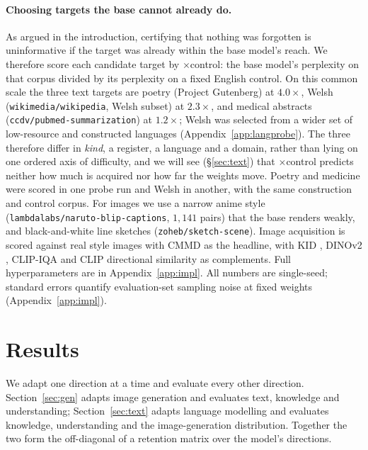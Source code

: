 \documentclass{article}
\begin{document}
\paragraph{Choosing targets the base cannot already do.}
As argued in the introduction, certifying that nothing was forgotten is
uninformative if the target was already within the base model's reach. We
therefore score each candidate target by $\times$control: the base model's
perplexity on that corpus divided by its perplexity on a fixed English control.
On this common scale the three text targets are poetry (Project Gutenberg) at
$4.0\times$, Welsh (\texttt{wikimedia/wikipedia}, Welsh subset) at $2.3\times$,
and medical abstracts (\texttt{ccdv/pubmed-summarization}) at $1.2\times$; Welsh
was selected from a wider set of low-resource and constructed languages
(Appendix~\ref{app:langprobe}). The
three therefore differ in \emph{kind}, a register, a language and a domain,
rather than lying on one ordered axis of difficulty, and we will see
(\S\ref{sec:text}) that $\times$control predicts neither how much is acquired nor
how far the weights move. Poetry and medicine were scored in one probe run and
Welsh in another, with the same construction and control corpus. For images we
use a narrow anime style (\texttt{lambdalabs/naruto-blip-captions}, $1{,}141$
pairs) that the base renders weakly, and black-and-white line sketches
(\texttt{zoheb/sketch-scene}). Image acquisition is scored against real style
images with CMMD \citep{cmmd} as the headline, with KID \citep{kid}, DINOv2
\citep{dinov2}, CLIP-IQA \citep{clipiqa} and CLIP directional similarity
\citep{stylegannada} as complements. Full hyperparameters are in
Appendix~\ref{app:impl}. All numbers are single-seed; standard errors quantify
evaluation-set sampling noise at fixed weights (Appendix~\ref{app:impl}).

\section{Results}
We adapt one direction at a time and evaluate every other direction.
Section~\ref{sec:gen} adapts image generation and evaluates text, knowledge and
understanding; Section~\ref{sec:text} adapts language modelling and evaluates
knowledge, understanding and the image-generation distribution. Together the two
form the off-diagonal of a retention matrix over the model's directions.
\end{document}
